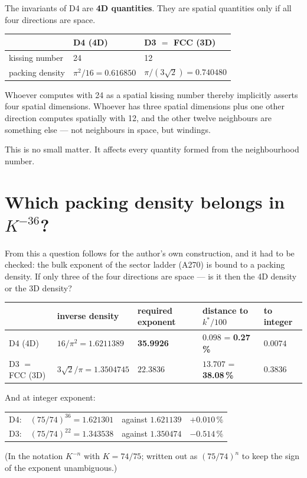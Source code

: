 \documentclass[11pt]{report}
\begin{document}
The invariants of D4 are \textbf{4D quantities}. They are spatial
quantities only if all four directions are space.

\begin{center}
\begin{tabular}{lll}
\toprule
 & D4 (4D) & D3 $=$ FCC (3D) \\
\midrule
kissing number & 24 & 12 \\
packing density & $\pi^2/16 = 0.616850$ & $\pi/(3\sqrt2) = 0.740480$ \\
\bottomrule
\end{tabular}
\end{center}

Whoever computes with 24 as a spatial kissing number thereby implicitly
asserts four spatial dimensions. Whoever has three spatial dimensions
plus one other direction computes spatially with 12, and the other
twelve neighbours are something else --- not neighbours in space, but
windings.

This is no small matter. It affects every quantity formed from the
neighbourhood number.

\section{Which packing density belongs in \texorpdfstring{$K^{-36}$}{K to the -36}?}

From this a question follows for the author's own construction, and it
had to be checked: the bulk exponent of the sector ladder (A270) is
bound to a packing density. If only three of the four directions are
space --- is it then the 4D density or the 3D density?

\begin{center}
\small
\begin{tabular}{lllll}
\toprule
 & inverse density & required exponent
 & distance to $k^*/100$ & to integer \\
\midrule
D4 (4D) & $16/\pi^2 = 1.6211389$ & \textbf{35.9926}
  & $0.098$ = \textbf{0.27\,\%} & $0.0074$ \\
D3 $=$ FCC (3D) & $3\sqrt2/\pi = 1.3504745$ & $22.3836$
  & $13.707$ = \textbf{38.08\,\%} & $0.3836$ \\
\bottomrule
\end{tabular}
\end{center}

And at integer exponent:
\begin{center}
\begin{tabular}{lllr}
D4: & $(75/74)^{36} = 1.621301$ & against $1.621139$ & $+0.010\,\%$ \\
D3: & $(75/74)^{22} = 1.343538$ & against $1.350474$ & $-0.514\,\%$ \\
\end{tabular}
\end{center}
(In the notation $K^{-n}$ with $K = 74/75$; written out as $(75/74)^n$
to keep the sign of the exponent unambiguous.)
\end{document}
